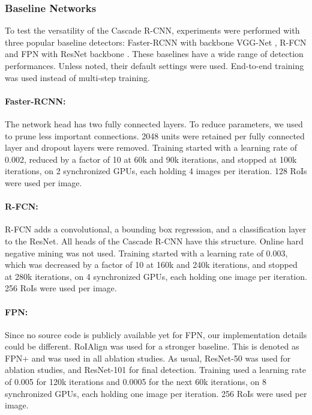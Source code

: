 \documentclass[10pt,twocolumn,letterpaper]{article}
\begin{document}
\subsubsection{Baseline Networks}
\label{subsubsec:baseline}

To test the versatility of the Cascade R-CNN, experiments were performed with three popular baseline detectors: Faster-RCNN with backbone VGG-Net \cite{DBLP:journals/corr/SimonyanZ14a}, R-FCN \cite{DBLP:conf/nips/DaiLHS16} and FPN \cite{lin2017feature} with ResNet backbone \cite{DBLP:conf/cvpr/HeZRS16}. These baselines have a wide range of detection performances. Unless noted, their default settings were used. End-to-end training was used instead of multi-step training.

\paragraph{Faster-RCNN:} The network head has two fully connected layers. To reduce parameters, we used \cite{DBLP:conf/nips/HanPTD15} to prune less important connections. 2048 units were retained per fully connected layer and dropout layers were removed. Training started with a learning rate of 0.002, reduced by a factor of 10 at 60k and 90k iterations, and stopped at 100k iterations, on 2 synchronized GPUs, each holding 4 images per iteration. 128 RoIs were used per image.

\paragraph{R-FCN:} R-FCN adds a convolutional, a bounding box regression, and a classification layer to the ResNet. All heads of the Cascade R-CNN have this structure. Online hard negative mining \cite{DBLP:conf/cvpr/ShrivastavaGG16} was not used. Training started with a learning rate of 0.003, which was decreased by a factor of 10 at 160k and 240k iterations, and stopped at 280k iterations, on 4 synchronized GPUs, each holding one image per iteration. 256 RoIs were used per image.

\paragraph{FPN:} Since no source code is publicly available yet for FPN, our implementation details could be different. RoIAlign \cite{he2017mask} was used for a stronger baseline. This is denoted as FPN+ and was used in all ablation studies. As usual, ResNet-50 was used for ablation studies, and ResNet-101 for final detection. Training used a learning rate of 0.005 for 120k
iterations and 0.0005 for the next 60k iterations, on 8 synchronized GPUs,
each holding one image per iteration. 256 RoIs were used per image.
\end{document}
